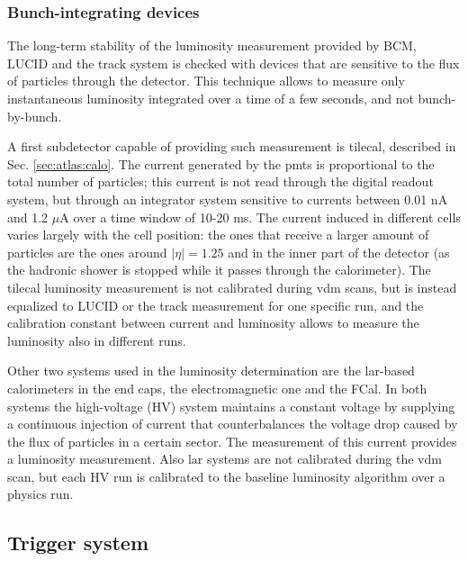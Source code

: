 \subsubsection*{Bunch-integrating devices}

The long-term stability of the luminosity measurement provided by BCM, LUCID and the track system is checked with devices that are sensitive to the flux of particles through the detector. This technique allows to measure only instantaneous luminosity integrated over a time of a few seconds, and not bunch-by-bunch.

A first subdetector capable of providing such measurement is \gls{tilecal}, described in Sec. \ref{sec:atlas:calo}. The current generated by the \glspl{pmt} is proportional to the total number of particles; this current is not read through the digital readout system, but through an integrator system sensitive to currents between 0.01 nA and 1.2 $\mu$A over a time window of 10-20 ms. The current induced in different cells varies largely with the cell position: the ones that receive a larger amount of particles are the ones around $|\eta|=1.25$ and in the inner part of the detector (as the hadronic shower is stopped while it passes through the calorimeter). The \gls{tilecal} luminosity measurement is not calibrated during \gls{vdm} scans, but is instead equalized to LUCID or the track measurement for one specific run, and the calibration constant between current and luminosity allows to measure the luminosity also in different runs.

Other two systems used in the luminosity determination are the \gls{lar}-based calorimeters in the end caps, the electromagnetic one and the FCal. In both systems the high-voltage (HV) system maintains a constant voltage by supplying a continuous injection of current that counterbalances the voltage drop caused by the flux of particles in a certain sector. The measurement of this current provides a luminosity measurement. Also \gls{lar} systems are not calibrated during the \gls{vdm} scan, but each HV run is calibrated to the baseline luminosity algorithm over a physics run.  


\subsection{Trigger system}
\label{sec:cern:trigger}

